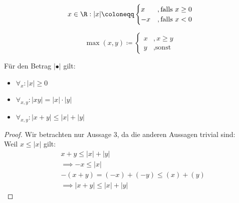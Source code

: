 \begin{definition}
\[
x \in \R : |x| \coloneqq \begin{cases}
	x &, \text{falls } x\ge 0 \\
	-x &, \text{falls } x<0
\end{cases} \]
\end{definition}
\begin{definition}[Maximum]
\[
\max(x,y) \coloneqq \begin{cases}
	x &, x\ge y \\
	y &, \text{sonst}
\end{cases}
\]
\end{definition}
\begin{theorem}
	Für den Betrag $|•|$ gilt:
\begin{itemize}
	\item $\forall_{x}: |x| \ge 0 $ 
	\item $\forall_{x,y}: |xy| = |x| \cdot |y| $
	\item $\forall_{x,y}: |x+y| \le |x| + |y| $ 
\end{itemize}
\end{theorem}
\begin{proof}
Wir betrachten nur Aussage 3, da die anderen Aussagen trivial sind: \\
Weil $x\le |x|$ gilt:
\begin{align*}
	&x+y \le |x| + |y| \\
	&\implies -x\le |x| \\
	&-(x+y) = (-x) + (-y) \le (x)+(y) \\
	&\implies |x+y| \le |x| + |y|
\end{align*}
\end{proof}
